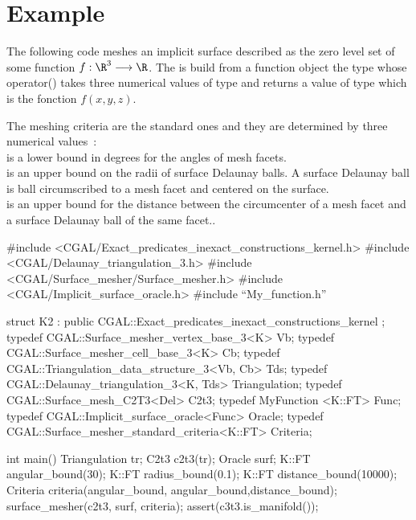 \section{Example}
\label{SurfaceMesher_section_example}

The following code meshes an implicit surface described as the zero level
set of some function $f : \R^3 \longrightarrow \R$.
The   is build from 
a function object
the type  whose operator()
takes three numerical values  of type 
and returns a value of type  which is the fonction $f(x,y,z)$.

The meshing criteria are the standard ones
and they are determined  by three numerical
values~: \\ 
 is a lower bound in degrees for the angles 
     of mesh facets.\\
 is an upper bound on the radii of surface Delaunay
balls. A surface Delaunay ball is ball circumscribed to  a mesh facet
and centered on the surface. \\
 is an upper bound for the distance 
between the circumcenter of a mesh facet and a surface
Delaunay ball of the same facet..

\begin{ccExampleCode}

#include <CGAL/Exact_predicates_inexact_constructions_kernel.h>
#include <CGAL/Delaunay_triangulation_3.h>
#include <CGAL/Surface_mesher/Surface_mesher.h>
#include <CGAL/Implicit_surface_oracle.h>
#include ``My_function.h''

struct K2 : public CGAL::Exact_predicates_inexact_constructions_kernel {};
typedef CGAL::Surface_mesher_vertex_base_3<K> Vb;
typedef CGAL::Surface_mesher_cell_base_3<K> Cb;
typedef CGAL::Triangulation_data_structure_3<Vb, Cb> Tds;
typedef CGAL::Delaunay_triangulation_3<K, Tds> Triangulation;
typedef CGAL::Surface_mesh_C2T3<Del> C2t3;
typedef MyFunction <K::FT> Func;
typedef CGAL::Implicit_surface_oracle<Func>  Oracle;
typedef  CGAL::Surface_mesher_standard_criteria<K::FT> Criteria;

int main() {
     Triangulation tr;
     C2t3      c2t3(tr);
     Oracle    surf;
     K::FT     angular_bound(30);
     K::FT     radius_bound(0.1);
     K::FT     distance_bound(10000);
     Criteria  criteria(angular_bound, angular_bound,distance_bound);
     surface_mesher(c2t3, surf, criteria);
     assert(c3t3.is_manifold());
}

\end{ccExampleCode}



